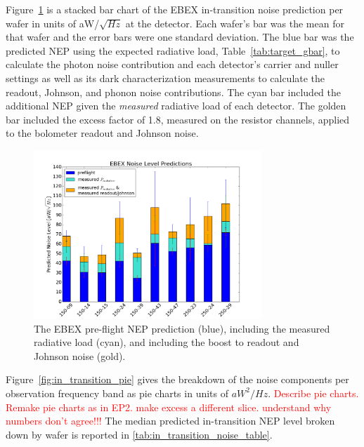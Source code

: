 Figure~\ref{fig:prediction_bar_chart} is a stacked bar chart of the \ac{EBEX} in-transition noise prediction per wafer in units of aW/$\sqrt{Hz}$ at the detector. 
Each wafer's bar was the mean for that wafer and the error bars were one standard deviation. 
The blue bar was the predicted \ac{NEP} using the expected radiative load, Table~\ref{tab:target_gbar}, to calculate the photon noise contribution and each detector's carrier and nuller settings as well as its dark characterization measurements to calculate the readout, Johnson, and phonon noise contributions. 
The cyan bar included the additional \ac{NEP} given the \textit{measured} radiative load of each detector. 
The golden bar included the excess factor of 1.8, measured on the resistor channels, applied to the bolometer readout and Johnson noise. 


\begin{figure}[ht!]
\begin{center}
\includegraphics[height=2.5in]{figures/ebex_noise_level_predictions_barchart_per_wafer}
\caption[In-transition noise prediction per wafer]{The \ac{EBEX} pre-flight \ac{NEP} prediction (blue), including the measured radiative load (cyan), and including the boost to readout and Johnson noise (gold).
\label{fig:prediction_bar_chart} }
\end{center}
\end{figure}

Figure~\ref{fig:in_transition_pie} gives the breakdown of the noise components per observation frequency band as pie charts in units of $aW^2/Hz$.
\textcolor{red}{Describe pie charts.}
\textcolor{red}{Remake pie charts as in EP2. make excess a different slice. understand why numbers don't agree!!!}
The median predicted in-transition \ac{NEP} level broken down by wafer is reported in \TAB\ref{tab:in_transition_noise_table}. 

